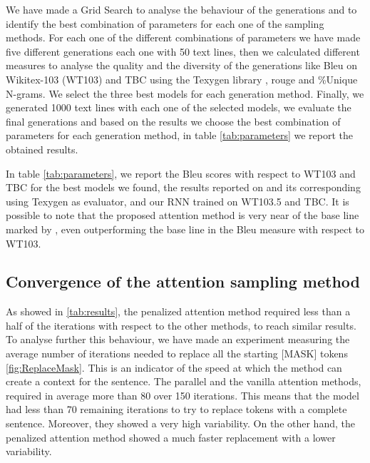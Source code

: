 \documentclass[10pt,twocolumn,letterpaper]{article}
\begin{document}

We have made a Grid Search to analyse the behaviour of the generations and to identify the best combination of parameters for each one of the sampling methods.
For each one of the different combinations of parameters we have made five different generations each one with 50 text lines,
then we calculated different measures to analyse the quality and the diversity of the generations like
Bleu on Wikitex-103 (WT103) and TBC using the Texygen library \cite{texygen}, rouge and \%Unique N-grams. We select the three best models for each
generation method. Finally, we generated 1000 text lines with each one
of the selected models, we evaluate the final generations and based on the results we choose the best combination of
parameters for each generation method, in table \ref{tab:parameters} we report the obtained results.

In table \ref{tab:parameters}, we report the Bleu scores with respect to WT103 and TBC for the best models we found,
the results reported on \cite{wang2019bert} and its corresponding using Texygen as evaluator, and our RNN trained on WT103.5 and TBC.
It is possible to note that the proposed attention method is very near of the base line marked by \cite{wang2019bert},
even outperforming the base line in the Bleu measure with respect to WT103.


\subsection{Convergence of the attention sampling method}
As showed in \ref{tab:results}, the penalized attention method required less than a half
of the iterations with respect to the other methods, to reach similar results.
To analyse further this behaviour, we have made an experiment measuring the average number
of iterations needed to replace all the starting [MASK] tokens \ref{fig:ReplaceMask}.
This is an indicator of the speed at which the method can create a context for the sentence.
The parallel and the vanilla attention methods, required in average more than 80 over 150 iterations.
This means that the model had less than 70 remaining iterations to try to replace tokens with a complete sentence.
Moreover, they showed a very high variability.
On the other hand, the penalized attention method showed a much faster replacement with a lower variability.
\end{document}
